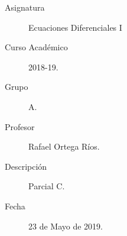 \documentclass[12pt]{article}
\begin{document}

    
    

    \begin{description}
        \item[Asignatura] Ecuaciones Diferenciales I
        \item[Curso Académico] 2018-19.
        \item[Grupo] A.
        \item[Profesor] Rafael Ortega Ríos.
        \item[Descripción] Parcial C.
        \item[Fecha] 23 de Mayo de 2019.
    \end{description}
    \newpage
\end{document}
